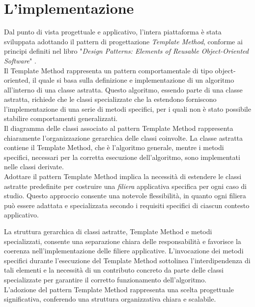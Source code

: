 \section[Implementazione]{L'implementazione}
Dal punto di vista progettuale e applicativo, l'intera piattaforma è stata sviluppata adottando il pattern di progettazione \textit{Template Method}, conforme ai principi definiti nel libro "\textit{Design Patterns: Elements of Reusable Object-Oriented Software}" \cite{designPatterns}. \\
Il Template Method rappresenta un pattern comportamentale di tipo object-oriented, il quale si basa sulla definizione e implementazione di un algoritmo all'interno di una classe astratta.
Questo algoritmo, essendo parte di una classe astratta, richiede che le classi specializzate che la estendono forniscono l'implementazione di una serie di metodi specifici, per i quali non è stato possibile stabilire comportamenti generalizzati. \\
Il diagramma delle classi associato al pattern Template Method rappresenta chiaramente l'organizzazione gerarchica delle classi coinvolte.
La classe astratta contiene il Template Method, che è l'algoritmo generale, mentre i metodi specifici, necessari per la corretta esecuzione dell'algoritmo, sono implementati nelle classi derivate. \\
Adottare il pattern Template Method implica la necessità di estendere le classi astratte predefinite per costruire una \textit{filiera} applicativa specifica per ogni caso di studio.
Questo approccio consente una notevole flessibilità, in quanto ogni filiera può essere adattata e specializzata secondo i requisiti specifici di ciascun contesto applicativo. 

La struttura gerarchica di classi astratte, Template Method e metodi specializzati, consente una separazione chiara delle responsabilità e favorisce la coerenza nell'implementazione delle filiere applicative.
L'invocazione dei metodi specifici durante l'esecuzione del Template Method sottolinea l'interdipendenza di tali elementi e la necessità di un contributo concreto da parte delle classi specializzate per garantire il corretto funzionamento dell'algoritmo. \\
L'adozione del pattern Template Method rappresenta una scelta progettuale significativa, conferendo una struttura organizzativa chiara e scalabile.

